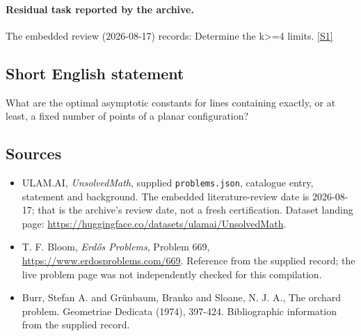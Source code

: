 \documentclass[11pt,a4paper]{article}
\newcommand{\sref}[2]{\hyperlink{source:#1:#2}{[S#2]}}
\begin{document}
\paragraph{Residual task reported by the archive.}

The embedded review (2026-08-17) records: Determine the k>=4 limits. \sref{statement}{1}

\subsection{Short English statement}

What are the optimal asymptotic constants for lines containing exactly, or at least, a fixed number of points of a planar configuration?

\subsection{Sources}

{\small

\begin{itemize}

\item[\hypertarget{source:statement:1}{S1}] ULAM.AI, \emph{UnsolvedMath}, supplied \texttt{problems.json}, catalogue entry, statement and background. The embedded literature-review date is 2026-08-17; that is the archive’s review date, not a fresh certification. Dataset landing page: \url{https://huggingface.co/datasets/ulamai/UnsolvedMath}.

\item[\hypertarget{source:statement:2}{S2}] T. F. Bloom, \emph{Erdős Problems}, Problem 669, \url{https://www.erdosproblems.com/669}. Reference from the supplied record; the live problem page was not independently checked for this compilation.

\item[\hypertarget{source:statement:3}{S3}] Burr, Stefan A. and Gr\"{u}nbaum, Branko and Sloane, N. J. A., The orchard problem. Geometriae Dedicata (1974), 397-424. Bibliographic information from the supplied record.

\end{itemize}

}

\label{end:statement}
\end{document}
